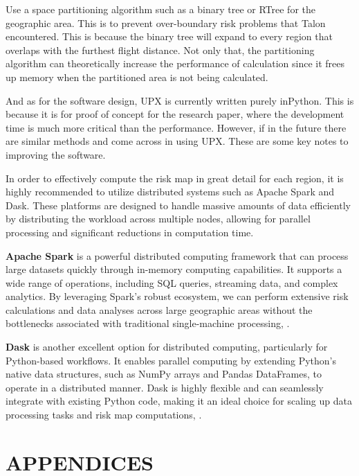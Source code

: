 \documentclass[12pt]{report}
\begin{document}
        Use a space partitioning algorithm such as a binary tree or RTree for the geographic area. This is to prevent
        over-boundary risk problems that Talon encountered. This is because the binary tree will expand to every region
        that overlaps with the furthest flight distance. Not only that, the partitioning algorithm can theoretically
        increase the performance of calculation since it frees up memory when the partitioned area is not being
        calculated.

        And as for the software design, UPX is currently written purely inPython. This is because it is for proof of
        concept for the research paper, where the development time is much more critical than the performance. However,
        if in the future there are similar methods and come across in using UPX. These are some key notes to improving
        the software.

        In order to effectively compute the risk map in great detail for each region, it is highly recommended to
        utilize distributed systems such as Apache Spark and Dask. These platforms are designed to handle massive
        amounts of data efficiently by distributing the workload across multiple nodes, allowing for parallel processing
        and significant reductions in computation time.
        
        \textbf{Apache Spark} is a powerful distributed computing framework that can process large datasets quickly
        through in-memory computing capabilities. It supports a wide range of operations, including SQL queries,
        streaming data, and complex analytics. By leveraging Spark's robust ecosystem, we can perform extensive risk
        calculations and data analyses across large geographic areas without the bottlenecks associated with traditional
        single-machine processing, \cite{the_apache_software_foundation_sparkr_2024}.
        
        \pagebreak
        \textbf{Dask} is another excellent option for distributed computing, particularly for Python-based workflows. It
        enables parallel computing by extending Python's native data structures, such as NumPy arrays and Pandas
        DataFrames, to operate in a distributed manner. Dask is highly flexible and can seamlessly integrate with
        existing Python code, making it an ideal choice for scaling up data processing tasks and risk map computations, 
        \cite{dask_development_team_dask_2016}.

\printbibliography
    \chapter*{APPENDICES}
\end{document}
